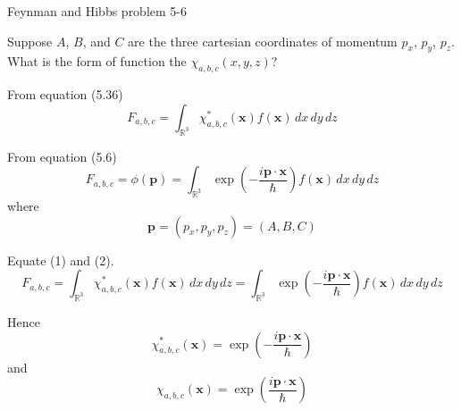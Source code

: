 \documentclass[12pt]{article}
\newcommand\INT{\int_{\mathbb R^3}}
\begin{document}
\begin{center}
Feynman and Hibbs problem 5-6
\end{center}

Suppose $A$, $B$, and $C$ are the three cartesian coordinates
of momentum $p_x$, $p_y$, $p_z$.
What is the form of function the $\chi_{a,b,c}(x,y,z)$?

\bigskip
From equation (5.36)
\begin{equation*}
F_{a,b,c}=\INT\chi_{a,b,c}^*(\mathbf x)f(\mathbf x)\,dx\,dy\,dz
\tag{1}
\end{equation*}

From equation (5.6)
\begin{equation*}
F_{a,b,c}=\phi(\mathbf p)=\INT\exp\left(-\frac{i\mathbf p\cdot\mathbf x}{\hbar}\right)f(\mathbf x)\,dx\,dy\,dz
\tag{2}
\end{equation*}
where
\begin{equation*}
\mathbf p=(p_x,p_y,p_z)=(A,B,C)
\end{equation*}

Equate (1) and (2).
\begin{equation*}
F_{a,b,c}=\INT\chi_{a,b,c}^*(\mathbf x)f(\mathbf x)\,dx\,dy\,dz
=\INT\exp\left(-\frac{i\mathbf p\cdot\mathbf x}{\hbar}\right)f(\mathbf x)\,dx\,dy\,dz
\end{equation*}

Hence
\begin{equation*}
\chi_{a,b,c}^*(\mathbf x)=\exp\left(-\frac{i\mathbf p\cdot\mathbf x}{\hbar}\right)
\end{equation*}
and
\begin{equation*}
\chi_{a,b,c}(\mathbf x)=\exp\left(\frac{i\mathbf p\cdot\mathbf x}{\hbar}\right)
\end{equation*}
\end{document}
